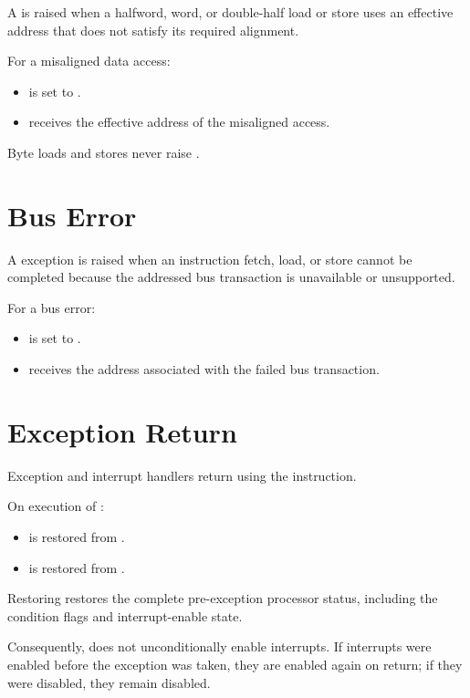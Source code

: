 A  is raised when a halfword, word, or double-half
load or store uses an effective address that does not satisfy its required alignment.

For a misaligned data access:

\begin{itemize}
\item {} is set to .
\item {} receives the effective address of the misaligned access.
\end{itemize}

Byte loads and stores never raise .

\section{Bus Error}

A  exception is raised when an instruction fetch, load, or store cannot
be completed because the addressed bus transaction is unavailable or unsupported.

For a bus error:

\begin{itemize}
\item {} is set to .
\item {} receives the address associated with the failed bus transaction.
\end{itemize}

\section{Exception Return}

Exception and interrupt handlers return using the  instruction.

On execution of :

\begin{itemize}
\item {} is restored from .
\item {} is restored from .
\end{itemize}

Restoring  restores the complete pre-exception processor status, including
the condition flags and interrupt-enable state.

Consequently,  does not unconditionally enable interrupts. If interrupts were
enabled before the exception was taken, they are enabled again on return; if they were
disabled, they remain disabled.

